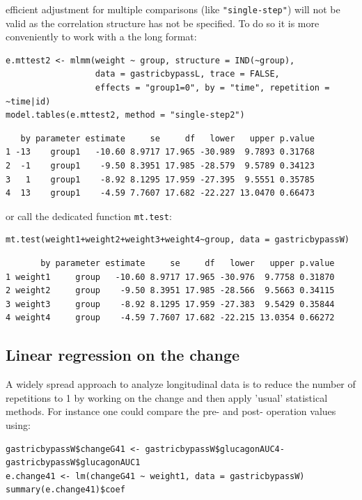 \documentclass[12pt]{article}
\newcommand\Warning[1][3ex]{%
\renewcommand\stacktype{L}%
\scaleto{\stackon[1.3pt]{\color{red}$\triangle$}{\tiny\bfseries !}}{#1}%
\xspace
}
\begin{document}
\Warning efficient adjustment for multiple comparisons (like
\texttt{"single-step"}) will not be valid as the correlation structure has
not be specified. To do so it is more conveniently to work with a the
long format:
\lstset{language=r,label= ,caption= ,captionpos=b,numbers=none}
\begin{lstlisting}
e.mttest2 <- mlmm(weight ~ group, structure = IND(~group),
                  data = gastricbypassL, trace = FALSE,
                  effects = "group1=0", by = "time", repetition = ~time|id)
model.tables(e.mttest2, method = "single-step2")
\end{lstlisting}

\begin{verbatim}
   by parameter estimate     se     df   lower   upper p.value
1 -13    group1   -10.60 8.9717 17.965 -30.989  9.7893 0.31768
2  -1    group1    -9.50 8.3951 17.985 -28.579  9.5789 0.34123
3   1    group1    -8.92 8.1295 17.959 -27.395  9.5551 0.35785
4  13    group1    -4.59 7.7607 17.682 -22.227 13.0470 0.66473
\end{verbatim}


or call the dedicated function \texttt{mt.test}:
\lstset{language=r,label= ,caption= ,captionpos=b,numbers=none}
\begin{lstlisting}
mt.test(weight1+weight2+weight3+weight4~group, data = gastricbypassW)
\end{lstlisting}

\begin{verbatim}
       by parameter estimate     se     df   lower   upper p.value
1 weight1     group   -10.60 8.9717 17.965 -30.976  9.7758 0.31870
2 weight2     group    -9.50 8.3951 17.985 -28.566  9.5663 0.34115
3 weight3     group    -8.92 8.1295 17.959 -27.383  9.5429 0.35844
4 weight4     group    -4.59 7.7607 17.682 -22.215 13.0354 0.66272
\end{verbatim}


\clearpage

\subsection{Linear regression on the change}
\label{sec:orgba7076a}

A widely spread approach to analyze longitudinal data is to reduce the
number of repetitions to 1 by working on the change and then apply
'usual' statistical methods. For instance one could compare the pre-
and post- operation values using:

\lstset{language=r,label= ,caption= ,captionpos=b,numbers=none}
\begin{lstlisting}
gastricbypassW$changeG41 <- gastricbypassW$glucagonAUC4-gastricbypassW$glucagonAUC1
e.change41 <- lm(changeG41 ~ weight1, data = gastricbypassW)
summary(e.change41)$coef
\end{lstlisting}
\end{document}
